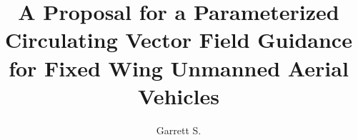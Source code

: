\documentclass[numbered,pdftex]{ohio-etd}
\title     {A Proposal for a Parameterized Circulating Vector Field Guidance for Fixed Wing Unmanned Aerial Vehicles}
\author    {Garrett S.}{Clem}
\begin{document}
\makefrontmatter    %



%
%
%
%
%
%
%
%
%
%
%
%
%
%
%
%
%
%
%
\end{document}

